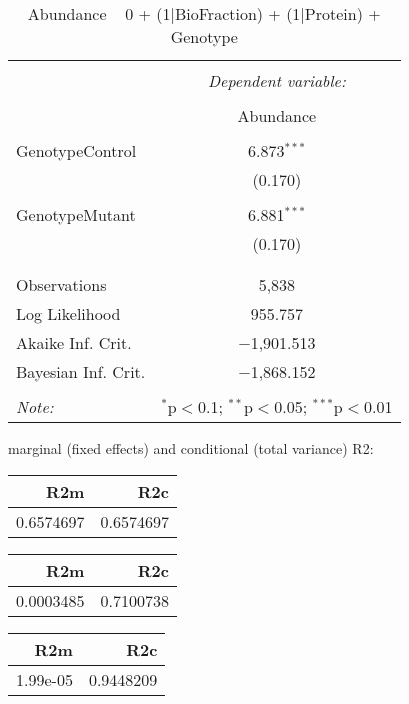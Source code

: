 \documentclass[11pt]{report}
\begin{document}
\begin{table}[!htbp] \centering 
  \caption{Abundance ~ 0 + (1|BioFraction) + (1|Protein) + Genotype} 
  \label{} 
\begin{tabular}{@{\extracolsep{5pt}}lc} 
\\[-1.8ex]\hline 
\hline \\[-1.8ex] 
 & \multicolumn{1}{c}{\textit{Dependent variable:}} \\ 
\cline{2-2} 
\\[-1.8ex] & Abundance \\ 
\hline \\[-1.8ex] 
 GenotypeControl & 6.873$^{***}$ \\ 
  & (0.170) \\ 
  & \\ 
 GenotypeMutant & 6.881$^{***}$ \\ 
  & (0.170) \\ 
  & \\ 
\hline \\[-1.8ex] 
Observations & 5,838 \\ 
Log Likelihood & 955.757 \\ 
Akaike Inf. Crit. & $-$1,901.513 \\ 
Bayesian Inf. Crit. & $-$1,868.152 \\ 
\hline 
\hline \\[-1.8ex] 
\textit{Note:}  & \multicolumn{1}{r}{$^{*}$p$<$0.1; $^{**}$p$<$0.05; $^{***}$p$<$0.01} \\ 
\end{tabular} 
\end{table} 
marginal (fixed effects) and conditional (total variance) R2:

\begin{tabular}{r|r}
\hline
R2m & R2c\\
\hline
0.6574697 & 0.6574697\\
\hline
\end{tabular}

\begin{tabular}{r|r}
\hline
R2m & R2c\\
\hline
0.0003485 & 0.7100738\\
\hline
\end{tabular}

\begin{tabular}{r|r}
\hline
R2m & R2c\\
\hline
1.99e-05 & 0.9448209\\
\hline
\end{tabular}
\end{document}
